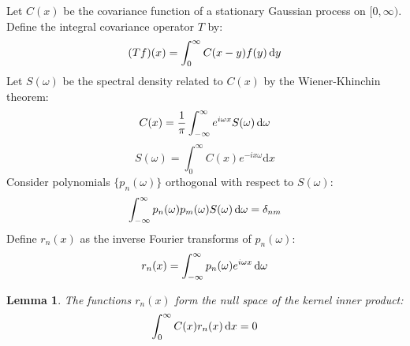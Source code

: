 \documentclass{article}
\newcommand{\mathd}{\mathrm{d}}
\newtheorem{lemma}{Lemma}
\providecommand{\mathd}{\mathrm{d}}
\begin{document}
Let $C (x)$ be the covariance function of a stationary Gaussian process on
$[0, \infty)$. Define the integral covariance operator $T$ by:
\begin{equation}
  (Tf) (x) = \int_0^{\infty} C (x - y) f (y)  \hspace{0.17em} \mathd y
\end{equation}
Let $S (\omega)$ be the spectral density related to $C (x)$ by the
Wiener-Khinchin theorem:
\begin{equation}
  C (x) = \frac{1}{\pi}  \int_{- \infty}^{\infty} e^{i \omega x} S (\omega) 
  \hspace{0.17em} \mathd \omega
\end{equation}
\begin{equation}
  S (\omega) = \int_0^{\infty} C (x) e^{- ix \omega} \mathd x
\end{equation}
Consider polynomials $\{p_n (\omega)\}$ orthogonal with respect to $S
(\omega)$:
\begin{equation}
  \int_{- \infty}^{\infty} p_n (\omega) p_m (\omega) S (\omega) 
  \hspace{0.17em} \mathd \omega = \delta_{nm}
\end{equation}
Define $r_n (x)$ as the inverse Fourier transforms of $p_n (\omega)$:
\begin{equation}
  r_n (x) = \int_{- \infty}^{\infty} p_n (\omega) e^{i \omega x} 
  \hspace{0.17em} \mathd \omega
\end{equation}
\begin{lemma}
  The functions $r_n (x)$ form the null space of the kernel inner product:
  \begin{equation}
    \int_0^{\infty} C (x) r_n (x)  \hspace{0.17em} \mathd x = 0
  \end{equation}
\end{lemma}
\end{document}
